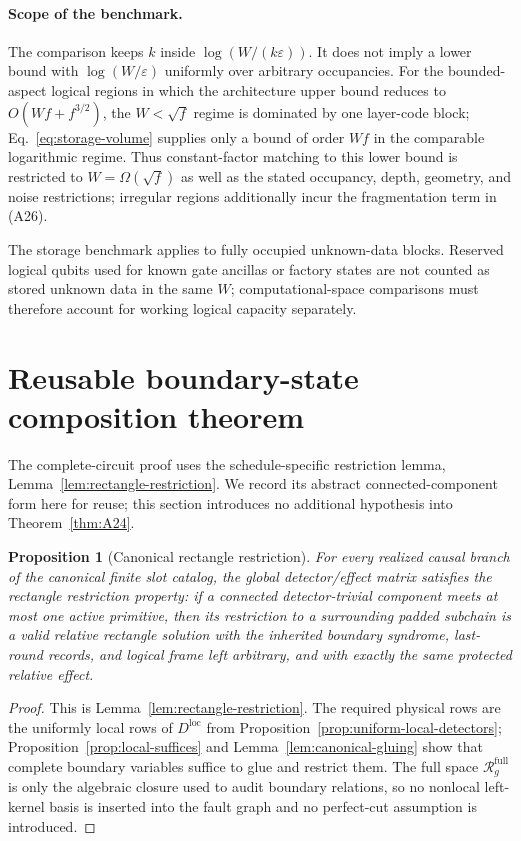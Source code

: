 \documentclass[aps,prx,reprint,superscriptaddress,nofootinbib,floatfix,longbibliography]{revtex4-2}
\newtheorem{proposition}[theorem]{Proposition}
\theoremstyle{definition}
\begin{document}
\paragraph{Scope of the benchmark.}
The comparison keeps $k$ inside $\log(W/(k\varepsilon))$. It does not imply a lower bound with $\log(W/\varepsilon)$ uniformly over arbitrary occupancies. For the bounded-aspect logical regions in which the architecture upper bound reduces to $O(Wf+f^{3/2})$, the $W<\sqrt f$ regime is dominated by one layer-code block; Eq.~\eqref{eq:storage-volume} supplies only a bound of order $Wf$ in the comparable logarithmic regime. Thus constant-factor matching to this lower bound is restricted to $W=\Omega(\sqrt f)$ as well as the stated occupancy, depth, geometry, and noise restrictions; irregular regions additionally incur the fragmentation term in (A26).

The storage benchmark applies to fully occupied unknown-data blocks. Reserved logical qubits used for known gate ancillas or factory states are not counted as stored unknown data in the same $W$; computational-space comparisons must therefore account for working logical capacity separately.



\section{Reusable boundary-state composition theorem}
\label{app:abstract-composition}
The complete-circuit proof uses the schedule-specific restriction lemma, Lemma~\ref{lem:rectangle-restriction}.  We record its abstract connected-component form here for reuse; this section introduces no additional hypothesis into Theorem~\ref{thm:A24}.

\begin{proposition}[Canonical rectangle restriction]
\label{prop:canonical-rectangle-restriction}
For every realized causal branch of the canonical finite slot catalog, the
global detector/effect matrix satisfies the rectangle restriction property:
if a connected detector-trivial component meets at most one active primitive,
then its restriction to a surrounding padded subchain is a valid relative
rectangle solution with the inherited boundary syndrome, last-round
records, and logical frame left arbitrary, and with exactly the same
protected relative effect.
\end{proposition}
\begin{proof}
This is Lemma~\ref{lem:rectangle-restriction}.  The required physical rows are
the uniformly local rows of $D^{\mathrm{loc}}$ from
Proposition~\ref{prop:uniform-local-detectors}; Proposition~\ref{prop:local-suffices}
and Lemma~\ref{lem:canonical-gluing} show that complete boundary variables
suffice to glue and restrict them.  The full space
$\mathcal R_g^{\mathrm{full}}$ is only the algebraic closure used to audit boundary
relations, so no nonlocal left-kernel basis is inserted into the fault graph
and no perfect-cut assumption is introduced.
\end{proof}
\end{document}
